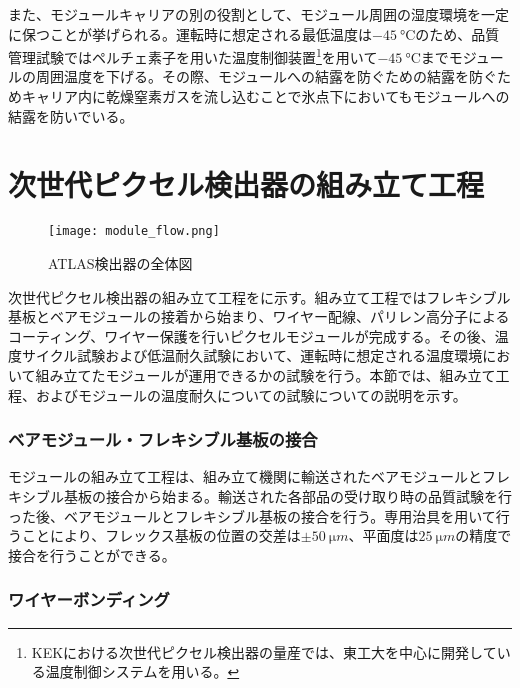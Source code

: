 また、モジュールキャリアの別の役割として、モジュール周囲の湿度環境を一定に保つことが挙げられる。運転時に想定される最低温度は$-45\ \si{\degreeCelsius}$のため、品質管理試験ではペルチェ素子を用いた温度制御装置\footnote{KEKにおける次世代ピクセル検出器の量産では、東工大を中心に開発している温度制御システムを用いる。}を用いて$-45\ \si{\degreeCelsius}$までモジュールの周囲温度を下げる。その際、モジュールへの結露を防ぐための結露を防ぐためキャリア内に乾燥窒素ガスを流し込むことで氷点下においてもモジュールへの結露を防いでいる。

\section{次世代ピクセル検出器の組み立て工程}
\label{sec:assemble}
\begin{figure}[tbp]
  \centering
  \texttt{[image: module\_flow.png]}
  \caption[ATLAS検出器]{ATLAS検出器の全体図 \cite{studyofID} }
  \label{fig:assemble}
\end{figure}


次世代ピクセル検出器の組み立て工程をに示す。組み立て工程ではフレキシブル基板とベアモジュールの接着から始まり、ワイヤー配線、パリレン高分子によるコーティング、ワイヤー保護を行いピクセルモジュールが完成する。その後、温度サイクル試験および低温耐久試験において、運転時に想定される温度環境において組み立てたモジュールが運用できるかの試験を行う。本節では、組み立て工程、およびモジュールの温度耐久についての試験についての説明を示す。

\subsubsection*{ベアモジュール・フレキシブル基板の接合}

モジュールの組み立て工程は、組み立て機関に輸送されたベアモジュールとフレキシブル基板の接合から始まる。輸送された各部品の受け取り時の品質試験を行った後、ベアモジュールとフレキシブル基板の接合を行う。専用治具を用いて行うことにより、フレックス基板の位置の交差は$\pm 50\ \si{\micro m}$、平面度は$25\ \si{\micro m}$の精度で接合を行うことができる。

\subsubsection*{ワイヤーボンディング}

